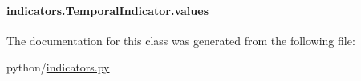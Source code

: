 \hypertarget{classindicators_1_1TemporalIndicator_ace57a2ba7a37d5e1fa0e1c91fb6ee1f8}{
\paragraph[{values}]{\setlength{\rightskip}{0pt plus 5cm}indicators.\-Temporal\-Indicator.\-values}}\label{classindicators_1_1TemporalIndicator_ace57a2ba7a37d5e1fa0e1c91fb6ee1f8}


The documentation for this class was generated from the following file\-:\begin{DoxyCompactItemize}
\item 
python/\hyperlink{indicators_8py}{indicators.\-py}\end{DoxyCompactItemize}
